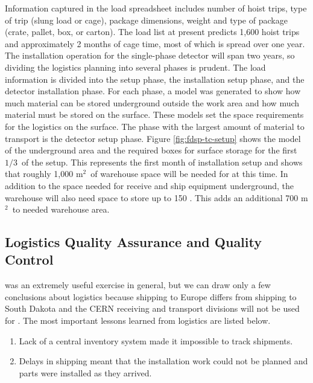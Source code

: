 Information captured in the load spreadsheet includes number of hoist trips, type of trip (slung load or cage), package dimensions, weight and type of package (crate, pallet, box, or carton). The load list at present predicts 1,600 hoist trips and approximately 2 months of cage time, most of which is spread over one year. The installation operation for the single-phase detector will span two years, so dividing the logistics planning into several phases is prudent. The load information is divided into the  setup phase, the installation setup phase, and the detector installation phase. For each phase, a model was generated to show how much material can be stored underground outside the work area and how much material must be stored on the surface. These models set the space requirements for the logistics on the surface. The phase with the largest amount of material to transport is the detector setup phase. Figure \ref{fig:fdsp-tc-setup} shows the model of the underground area and the required boxes for surface storage for the first $1/3$\ of the setup. This represents the first month of installation setup and shows that roughly 1,000 m$^2$\ of warehouse space will be needed for  at this time. In addition to the space needed for receive and ship equipment underground, the warehouse will also need space to store up to 150 . This adds an additional 700 m$^2$\ to needed warehouse area. 


\subsection{Logistics Quality Assurance and Quality Control}
\label{sec:fdsp-tc-log-qaqc}


 was an extremely useful exercise in general, but we can draw only a few conclusions about  logistics because shipping to Europe differs from shipping to South Dakota and the CERN receiving and transport divisions will not be used for . The most important lessons learned from  logistics are listed below.
\begin{enumerate}
\item Lack of a central inventory system made it impossible to track shipments.
\item Delays in shipping meant that the installation work could not be planned and parts were installed as they arrived. 
\end{enumerate}

